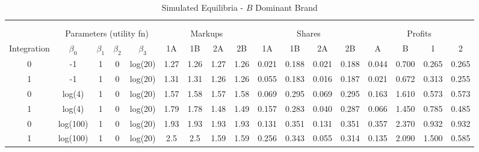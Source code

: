 \documentclass[12pt]{article}%
\begin{document}
\begin{table}[h]
{\begin{tabular}{c|cccc|cccc|cccc|cccc}
    \multicolumn{1}{c}{} &       &       &       & \multicolumn{1}{c}{} &       &       &       & \multicolumn{1}{c}{} &       &       &       & \multicolumn{1}{c}{} &       &       &       &  \\
    \multicolumn{1}{c}{} &       &       &       & \multicolumn{1}{c}{} &       &       &       & \multicolumn{1}{c}{} &       &       &       & \multicolumn{1}{c}{} &       &       &       &  \\
          & \multicolumn{4}{c|}{Parameters (utility fn)} & \multicolumn{4}{c|}{Markups}  & \multicolumn{4}{c|}{Shares}   & \multicolumn{4}{c}{Profits} \\
    \midrule
    \multicolumn{1}{c|}{Integration} & \multicolumn{1}{c}{$\beta_0$} & \multicolumn{1}{c}{$\beta_1$} & \multicolumn{1}{c}{$\beta_2$} & \multicolumn{1}{c|}{$\beta_3$} & \multicolumn{1}{c}{1A} & \multicolumn{1}{c}{1B} & \multicolumn{1}{c}{2A} & \multicolumn{1}{c|}{2B} & \multicolumn{1}{c}{1A} & \multicolumn{1}{c}{1B} & \multicolumn{1}{c}{2A} & \multicolumn{1}{c|}{2B} & \multicolumn{1}{c}{A} & \multicolumn{1}{c}{B} & \multicolumn{1}{c}{1} & \multicolumn{1}{c}{2} \\
    \midrule
    \midrule

    0     & -1    & 1     & 0     & log(20) & 1.27  & 1.26  & 1.27  & 1.26  & 0.021 & 0.188 & 0.021 & 0.188 & 0.044 & 0.700 & 0.265 & 0.265 \\
    1     & -1    & 1     & 0     & log(20) & 1.31  & 1.31  & 1.26  & 1.26  & 0.055 & 0.183 & 0.016 & 0.187 & 0.021 & 0.672 & 0.313 & 0.255 \\
    0     & log(4) & 1     & 0     & log(20) & 1.57  & 1.58  & 1.57  & 1.58  & 0.069 & 0.295 & 0.069 & 0.295 & 0.163 & 1.610 & 0.573 & 0.573 \\
    1     & log(4) & 1     & 0     & log(20) & 1.79  & 1.78  & 1.48  & 1.49  & 0.157 & 0.283 & 0.040 & 0.287 & 0.066 & 1.450 & 0.785 & 0.485 \\
    0     & log(100) & 1     & 0     & log(20) & 1.93  & 1.93  & 1.93  & 1.93  & 0.131 & 0.351 & 0.131 & 0.351 & 0.357 & 2.370 & 0.932 & 0.932 \\
    1     & log(100) & 1     & 0     & log(20) & 2.5   & 2.5   & 1.59  & 1.59  & 0.256 & 0.343 & 0.055 & 0.314 & 0.135 & 2.090 & 1.500 & 0.585 \\

    \end{tabular}%

    }
    
    \caption{Simulated Equilibria - $B$ Dominant Brand}
    
  \label{tab:brand effects - b dom}%
\end{table}%
\end{document}
